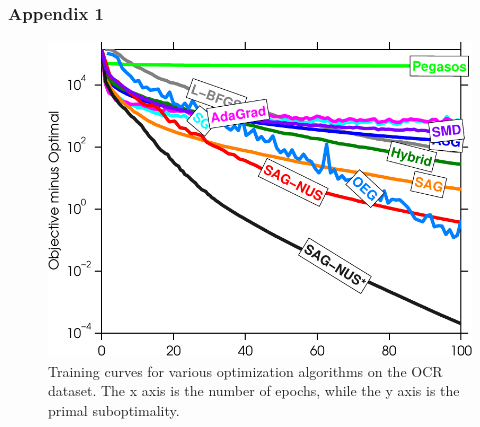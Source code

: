 \documentclass{beamer}
\DeclareMathOperator{\1}{\mathbb{1}}
\begin{document}
\begin{frame}
	\frametitle{Appendix 1}
	\begin{figure}
	\center
	\includegraphics[width=.5\textwidth]{images/ocr2_train_passes.pdf}
	\caption{Training curves for various optimization algorithms on the OCR dataset. The x axis is the number of epochs, while the y axis is the primal suboptimality.}
	\label{schmidt's curves}
	\end{figure}
\end{frame}
\end{document}
